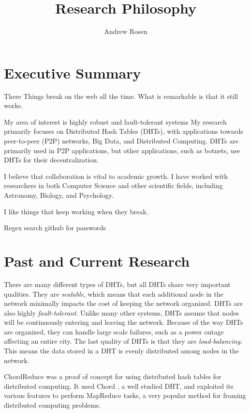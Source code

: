 \documentclass[10pt, a4paper]{article}
\author{Andrew Rosen}
\title{Research Philosophy}
\date{}
\begin{document}
\maketitle



\section*{Executive Summary}



There
Things break on the web all the time.
What is remarkable is that it still works.

My area of interest is highly robust and fault-tolerant systems
My research primarily focuses on Distributed Hash Tables (DHTs), with applications towards peer-to-peer (P2P) networks, Big Data, and Distributed Computing.
DHTs are primarily used in P2P applications, but other applications, such as botnets, use DHTs for their decentralization.


I believe that collaboration is vital to academic growth.
I have worked with researchers in both Computer Science and other scientific fields, including Astronomy, Biology, and Psychology.


I like things that keep working when they break.


Regex search github for passwords


\section{Past and Current Research}

There are many different types of DHTs, but all DHTs share very important qualities.
They are \textit{scalable}, which means that each additional node in the network minimally impacts the cost of keeping the network organized.
DHTs are also highly \textit{fault-tolerant}.
Unlike many other systems, DHTs assume that nodes will be continuously entering and leaving the network.
Because of the way DHTs are organized, they can handle large scale failures, such as a power outage affecting an entire city.
The last quality of DHTs is that they are  \textit{load-balancing}. 
This means the data stored in a DHT is evenly distributed among nodes in the network.


ChordReduce \cite{chordreduce} was a proof of concept for using distributed hash tables for distributed computing.  
It used Chord \cite{chord}, a well studied DHT, and exploited its various features to perform MapReduce \cite{mapreduce} tasks, a very popular method for framing distributed computing problems.
\end{document}
